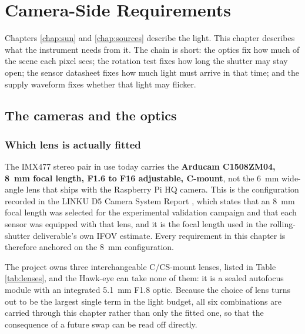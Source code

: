 \chapter{Camera-Side Requirements}
\label{chap:cameras}

Chapters \ref{chap:sun} and \ref{chap:sources} describe the light. This chapter describes what the instrument needs from it. The chain is short: the optics fix how much of the scene each pixel sees; the rotation test fixes how long the shutter may stay open; the sensor datasheet fixes how much light must arrive in that time; and the supply waveform fixes whether that light may flicker.

\section{The cameras and the optics}

\subsection{Which lens is actually fitted}

The IMX477 stereo pair in use today carries the \textbf{Arducam C1508ZM04, 8~mm focal length, F1.6 to F16 adjustable, C-mount}, not the 6~mm wide-angle lens that ships with the Raspberry Pi HQ camera. This is the configuration recorded in the LINKU D5 Camera System Report \cite{linku_d5_camera_report}, which states that an 8~mm focal length was selected for the experimental validation campaign and that each sensor was equipped with that lens, and it is the focal length used in the rolling-shutter deliverable's own IFOV estimate. Every requirement in this chapter is therefore anchored on the 8~mm configuration.

The project owns three interchangeable C/CS-mount lenses, listed in Table \ref{tab:lenses}, and the Hawk-eye can take none of them: it is a sealed autofocus module with an integrated 5.1~mm F1.8 optic. Because the choice of lens turns out to be the largest single term in the light budget, all six combinations are carried through this chapter rather than only the fitted one, so that the consequence of a future swap can be read off directly.

